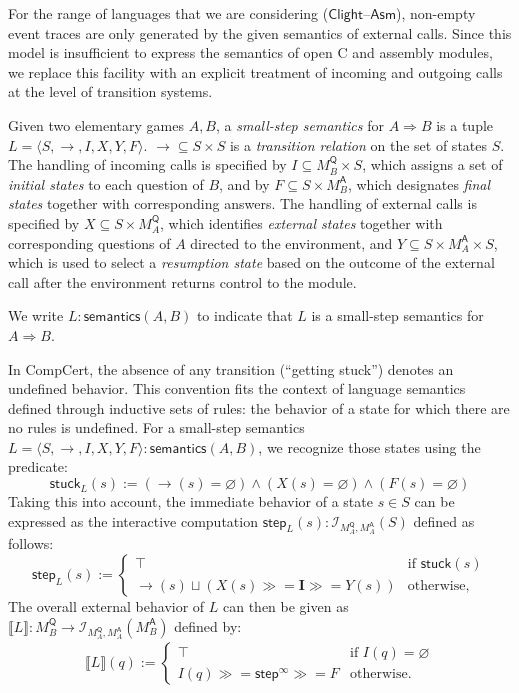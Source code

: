 \documentclass[acmsmall,timestamp,review,anonymous]{acmart}
\newcommand{\kw}[1]{\ensuremath{ \mathsf{#1} }}
\newcommand{\bind}{\gg\!\!=}
\begin{document}
For the range of languages that we are considering
($\kw{Clight}$--$\kw{Asm}$),
non-empty event traces are only generated by
the given semantics of external calls.
Since this model is insufficient to express
the semantics of open C and assembly modules,
we replace this facility with
an explicit treatment of incoming and outgoing calls
at the level of transition systems.

\begin{definition}
Given two elementary games $A, B$,
a \emph{small-step semantics} for $A \Rightarrow B$
is a tuple $L = \langle S, \rightarrow, I, X, Y, F \rangle$.
${\rightarrow} \subseteq S \times S$ is a \emph{transition relation} on
the set of states $S$.
The handling of incoming calls is specified by
$I \subseteq M_B^\kw{Q} \times S$, which
assigns a set of \emph{initial states} to each question of $B$, and by
$F \subseteq S \times M_B^\kw{A}$,
which designates \emph{final states} together with corresponding answers.
The handling of external calls is specified by
$X \subseteq S \times M_A^\kw{Q}$,
which identifies \emph{external states} together with
corresponding questions of $A$ directed to the environment, and
$Y \subseteq S \times M_A^\kw{A} \times S$,
which is used to select a \emph{resumption state}
based on the outcome of the external call
after the environment returns control to the module.

We write $L : \kw{semantics}(A, B)$ to indicate that
$L$ is a small-step semantics for $A \Rightarrow B$.
\end{definition}

In CompCert, the absence of any transition (``getting stuck'')
denotes an undefined behavior.
This convention fits the context of
language semantics defined through inductive sets of rules:
the behavior of a state for which there are no rules is undefined.
For a small-step semantics
$L = \langle S, {\rightarrow}, I, X, Y, F \rangle : \kw{semantics}(A,B)$,
we recognize those states using the predicate:
\[
    \kw{stuck}_L(s) :=
      ({\rightarrow}(s) = \varnothing) \wedge
      (X(s) = \varnothing) \wedge
      (F(s) = \varnothing)
\]
Taking this into account,
the immediate behavior of a state $s \in S$
can be expressed as the interactive computation
$\kw{step}_L(s) : \mathcal{I}_{M_A^\kw{Q},M_A^\kw{A}}(S)$
defined as follows:
\[
  \kw{step}_L(s) :=
    \begin{cases}
      \top & \mbox{if } \kw{stuck}(s) \\
      {\rightarrow}(s) \sqcup
      (X(s) \bind \mathbf{I} \bind Y(s)) & \mbox{otherwise,}
   \end{cases}
\]
The overall external behavior of $L$
can then be given as
$
    \llbracket L \rrbracket :
      M_B^\kw{Q} \rightarrow \mathcal{I}_{M_A^\kw{Q},M_A^\kw{A}}(M_B^\kw{A})
$
defined by:
\begin{align*}
  \llbracket L \rrbracket (q) :=
    \begin{cases}
       \top & \mbox{if } I(q) = \varnothing \\
       I(q) \bind \kw{step}^\infty \bind F & \mbox{otherwise.}
     \end{cases}
\end{align*}
\end{document}
